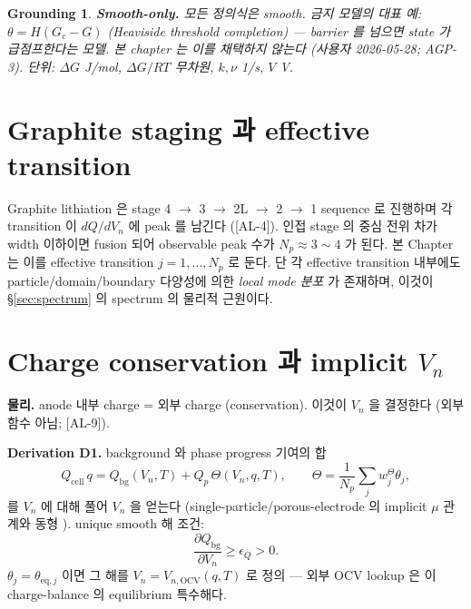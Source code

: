 \documentclass[11pt,a4paper]{article}
\newtheorem*{groundingbox}{Grounding}
\newcommand{\eq}{\mathrm{eq}}
\newcommand{\bg}{\mathrm{bg}}
\newcommand{\cell}{\mathrm{cell}}
\newcommand{\AL}[1]{\textsf{[AL-#1]}}
\begin{document}
\begin{groundingbox}
\textbf{Smooth-only.} 모든 정의식은 smooth. 금지 모델의 대표 예: $\theta=H(G_c-G)$
(Heaviside threshold completion) — barrier 를 넘으면 state 가 급점프한다는 모델. 본 chapter
는 이를 채택하지 않는다 (사용자 2026-05-28; AGP-3). 단위: $\Delta G$ J/mol, $\Delta G/RT$
무차원, $k,\nu$ 1/s, $V$ V.
\end{groundingbox}

\section{Graphite staging 과 effective transition}\label{sec:staging}
Graphite lithiation 은 stage 4 $\to$ 3 $\to$ 2L $\to$ 2 $\to$ 1 sequence 로 진행하며 각
transition 이 $dQ/dV_n$ 에 peak 를 남긴다 \cite{dahn1991,ohzuku1993,funabiki1999} (\AL{4}).
인접 stage 의 중심 전위 차가 width 이하이면 fusion 되어 observable peak 수가 $N_p\approx
3\sim4$ 가 된다. 본 Chapter 는 이를 effective transition $j=1,\dots,N_p$ 로 둔다. 단 각
effective transition 내부에도 particle/domain/boundary 다양성에 의한 \emph{local mode 분포}
가 존재하며, 이것이 \S\ref{sec:spectrum} 의 spectrum 의 물리적 근원이다.

\section{Charge conservation 과 implicit $V_n$}\label{sec:charge}
\textbf{물리.} anode 내부 charge = 외부 charge (conservation). 이것이 $V_n$ 을 결정한다
(외부 함수 아님; \AL{9}).

\textbf{Derivation D1.} background 와 phase progress 기여의 합
\begin{equation}
Q_\cell\,q = Q_\bg(V_n,T) + Q_p\,\Theta(V_n,q,T),\qquad \Theta=\frac1{N_p}\sum_j w^\Theta_j\theta_j,
\label{eq:charge_balance}
\end{equation}
를 $V_n$ 에 대해 풀어 $V_n$ 을 얻는다 (single-particle/porous-electrode 의 implicit $\mu$
관계와 동형 \cite{doyle1993,newman}). unique smooth 해 조건:
\begin{equation}
\frac{\partial Q_\bg}{\partial V_n}\ge\epsilon_Q>0.
\label{eq:monotone}
\end{equation}
$\theta_j=\theta_{\eq,j}$ 이면 그 해를 $V_n=V_{n,\mathrm{OCV}}(q,T)$ 로 정의 — 외부 OCV
lookup 은 이 charge-balance 의 equilibrium 특수해다.
\end{document}
